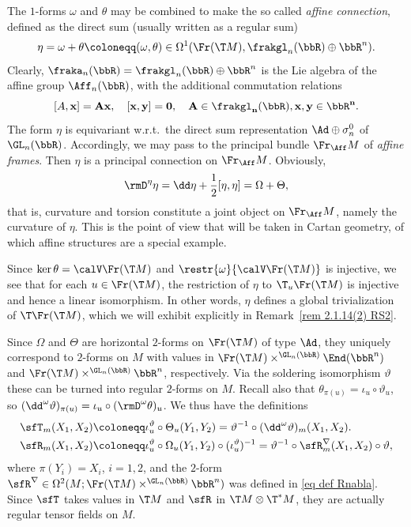 \begin{rem}\label{rem 2.1.14(1) RS2}
    The $1$-forms $\omega$ and $\theta$  may be combined to make the so called \emph{affine connection}, defined as the direct sum (usually written as a regular sum)
    \[\eta=\omega+\theta\coloneqq (\omega,\theta)\in \Omega^1(\Fr(\T M),\frakgl_n(\bbR)\oplus\bbR^n).\]
    Clearly, $\fraka_n(\bbR)=\frakgl_n(\bbR)\oplus \bbR^n$ is the Lie algebra of the affine group $\Aff_n(\bbR)$, with the additional commutation relations
    \[[A,\bf{x}]=A\bf{x},\quad [\bf{x},\bf{y}]=0,\quad A\in\frakgl_n(\bbR),\bf{x},\bf{y}\in\bbR^n.\]
    The form $\eta$ is equivariant w.r.t.\ the direct sum representation $\Ad\oplus \sigma_n^0$ of $\GL_n(\bbR)$. Accordingly, we may pass to the principal bundle $\Fr_{\Aff} M$ of \emph{affine frames}. Then $\eta$ is a principal connection on $\Fr_{\Aff}M$. Obviously,
    \[\rmD^\eta\eta=\dd \eta+\frac12[\eta,\eta]=\Omega+\Theta,\]
    that is, curvature and torsion constitute a joint object on $\Fr_{\Aff} M$, namely the curvature of $\eta$. This is the point of view that will be taken in Cartan geometry, of which affine structures are a special example.

    Since $\ker\theta=\calV \Fr(\T M)$ and $\restr{\omega}{\calV \Fr(\T M)}$ is injective, we see that for each $u\in\Fr(\T M)$, the restriction of $\eta$ to $\T_u \Fr(\T M)$ is injective and hence a linear isomorphism. In other words, $\eta$ defines a global trivialization of $\T\Fr(\T M)$, which we will exhibit explicitly in Remark~\ref{rem 2.1.14(2) RS2}.
\end{rem}

Since $\Omega$ and $\Theta$ are horizontal $2$-forms on $\Fr(\T M)$ of type $\Ad$, they uniquely correspond to $2$-forms on $M$ with values in $\Fr(\T M)\times^{\GL_n(\bbR)}\End(\bbR^n)$ and $\Fr(\T M)\times^{\GL_n(\bbR)}\bbR^n$, respectively. Via the soldering isomorphism $\vartheta$ these can be turned into regular $2$-forms on $M$. Recall also that $\theta_{\pi(u)}=\iota_u\circ \vartheta_u$, so $(\dd^\omega \vartheta)_{\pi(u)}=\iota_u\circ (\rmD^\omega\theta)_u$. We thus have the definitions
\begin{align}
    \sfT_m(X_1,X_2)\coloneqq &\iota_u^\vartheta\circ \Theta_u(Y_1,Y_2)=\vartheta^{-1}\circ (\dd^\omega \vartheta)_m(X_1,X_2).\\
    \sfR_m(X_1,X_2)\coloneqq & \iota_u^\vartheta\circ \Omega_u(Y_1,Y_2)\circ (\iota_u^\vartheta)^{-1}=\vartheta^{-1}\circ \sfR^\nabla_m(X_1,X_2)\circ \vartheta,
\end{align}
where $\pi(Y_i)=X_i$, $i=1,2$, and the $2$-form $\sfR^\nabla\in\Omega^2(M;\Fr(\T M)\times^{\GL_n(\bbR)}\bbR^n)$ was defined in \eqref{eq def Rnabla}. Since $\sfT$ takes values in $\T M$ and $\sfR$ in $\T M\otimes \T^\ast M$, they are actually regular tensor fields on $M$.

